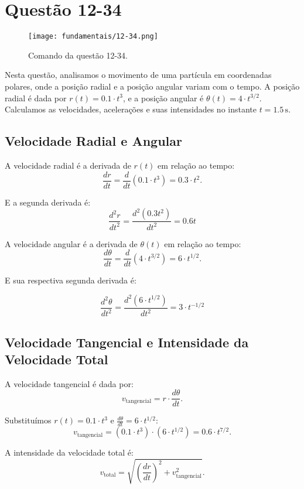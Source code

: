 \newpage
\section{Questão 12-34}

\begin{figure}[H]
	\centering
	\texttt{[image: fundamentais/12-34.png]}
	\caption{Comando da questão 12-34.}\label{fig:12-34}
\end{figure}


Nesta questão, analisamos o movimento de uma partícula em coordenadas polares, onde a posição radial e a posição angular variam com o tempo. A posição radial é dada por \(r(t) = 0.1 \cdot t^3\), e a posição angular é \( \theta(t) = 4 \cdot t^{3/2}\). Calculamos as velocidades, acelerações e suas intensidades no instante \(t = 1.5 \, \text{s}\).

\subsection*{Velocidade Radial e Angular}
A velocidade radial é a derivada de \(r(t)\) em relação ao tempo:
\[
\frac{dr}{dt} = \frac{d}{dt}\left(0.1 \cdot t^3\right) = 0.3 \cdot t^2.
\]

E a segunda derivada é:
\[
\frac{d^2r}{dt^2} = \frac{d^2\left(0.3t^2\right)}{dt^2} = 0.6t
\]

A velocidade angular é a derivada de \(\theta(t)\) em relação ao tempo:
\[
\frac{d\theta}{dt} = \frac{d}{dt}\left(4 \cdot t^{3/2}\right) = 6 \cdot t^{1/2}.
\]

E sua respectiva segunda derivada é:

\[
\frac{d^2\theta}{dt^2} = \frac{d^2\left(6\cdot t^{1/2}\right)}{dt^2} = 3\cdot t^{-1/2}
\]

\subsection*{Velocidade Tangencial e Intensidade da Velocidade Total}
A velocidade tangencial é dada por:
\[
v_{\text{tangencial}} = r \cdot \frac{d\theta}{dt}.
\]

Substituímos \(r(t) = 0.1 \cdot t^3\) e \(\frac{d\theta}{dt} = 6 \cdot t^{1/2}\):
\[
v_{\text{tangencial}} = \left(0.1 \cdot t^3\right) \cdot \left(6 \cdot t^{1/2}\right) = 0.6 \cdot t^{7/2}.
\]

A intensidade da velocidade total é:
\[
v_{\text{total}} = \sqrt{\left(\frac{dr}{dt}\right)^2 + v_{\text{tangencial}}^2}.
\]

